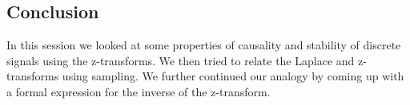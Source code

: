 \subsection{Conclusion}
In this session we looked at some properties of causality and stability of discrete signals using the z-transforms. We then tried to relate the Laplace and z-transforms using sampling. We further continued our analogy by coming up with a formal expression for the inverse of the z-transform.

